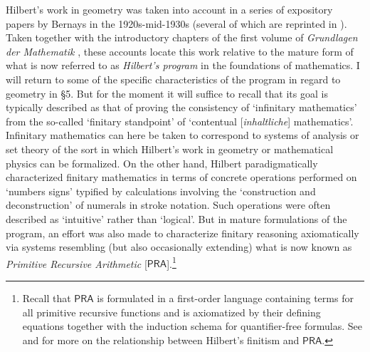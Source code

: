 \documentclass[11pt,fleqn,leqno]{article}
\begin{document}
Hilbert's work in geometry was taken into account in a series of expository papers by Bernays in the 1920s-mid-1930s (several of which are reprinted in \citeyear{Bernays1976}). Taken together with the introductory chapters of the first volume of \textsl{Grundlagen der Mathematik} \citeyearpar{Hilbert1934}, these accounts locate this work relative to the mature form of what is now referred to as \textsl{Hilbert's program} in the foundations of mathematics.  I will return to some of the specific characteristics of the program in regard to geometry in \S 5.  But for the moment it will suffice to recall that its goal is typically described as that of proving the consistency of `infinitary mathematics' from the so-called `finitary standpoint' of `contentual [\textsl{inhaltliche}] mathematics'.  Infinitary mathematics can here be taken to correspond to systems of analysis or set theory of the sort in which Hilbert's work in geometry or mathematical physics can be formalized.   On the other hand, Hilbert paradigmatically characterized finitary mathematics in terms of concrete operations performed on `numbers signs' typified by  calculations involving the `construction and deconstruction' of numerals in stroke notation.  Such operations were often described as `intuitive' rather than `logical'.  But in mature formulations of the program, an effort was also made to characterize finitary reasoning axiomatically via systems resembling (but also occasionally extending) what is now known as \textsl{Primitive Recursive Arithmetic} [$\mathsf{PRA}$].\footnote{Recall that $\mathsf{PRA}$ is formulated in a first-order language containing terms for all primitive recursive functions and is axiomatized by their defining equations together with the induction schema for quantifier-free formulas.  See \citep[\S 1-\S 2]{Tait2005} and \citep[\S 2]{Dean2017b} for more on the relationship between Hilbert's finitism and $\mathsf{PRA}$.}
\end{document}

